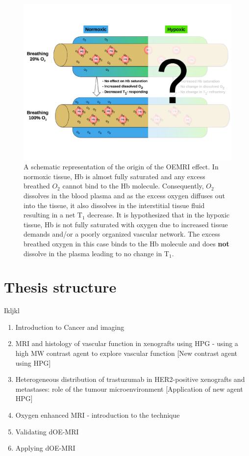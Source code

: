 	\begin{figure}
		\begin{center}
		\includegraphics[width=\textwidth]{./intro/intro-images/oemriDark.pdf}
		\caption{A schematic representation of the origin of the OEMRI effect. In normoxic tissue, Hb is almost fully saturated and any excess breathed ${O_2}$ cannot bind to the Hb molecule. Consequently, ${O_2}$ dissolves in the blood plasma and as the excess oxygen diffuses out into the tissue, it also dissolves in the interstitial tissue fluid resulting in a net T$_1$ decrease. It is hypothesized that in the hypoxic tissue, Hb is not fully saturated with oxygen due to increased tissue demands and/or a poorly organized vascular network. The excess breathed oxygen in this case binds to the Hb molecule and does \textbf{not} dissolve in the plasma leading to no change in T$_1$.}
		\label{oemri}
		\end{center}
	\end{figure}

\section{Thesis structure}
Ikljkl
\begin{enumerate}
\item Introduction to Cancer and imaging
\item MRI and histology of vascular function in xenografts using HPG - using a high MW contrast agent to explore vascular function [New contrast agent using HPG] 
\item Heterogeneous distribution of trastuzumab in HER2-positive xenografts and metastases: role of the tumour microenvironment [Application of new agent HPG]
\item Oxygen enhanced MRI - introduction to the technique
\item Validating dOE-MRI
\item Applying dOE-MRI
\end{enumerate}
